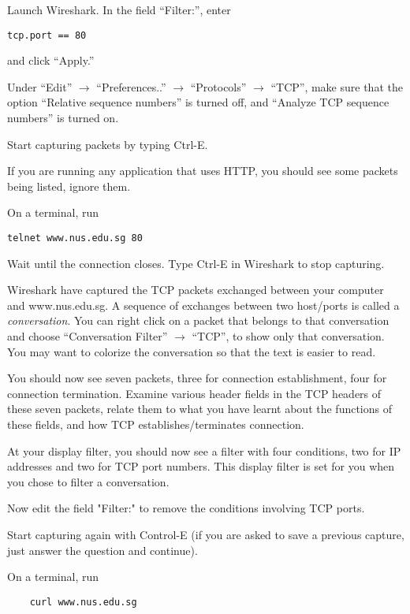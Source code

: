 \documentclass[a4paper,11pt]{exam}
\begin{document}
\begin{questions}

\question Launch Wireshark.  In the field ``Filter:'', enter 
\begin{verbatim}
tcp.port == 80
\end{verbatim}
and click ``Apply.''

Under ``Edit'' $\rightarrow$ ``Preferences..'' $\rightarrow$ ``Protocols'' $\rightarrow$ ``TCP'', make sure that the option ``Relative sequence numbers'' is turned off, and ``Analyze TCP sequence numbers'' is turned on.  

Start capturing packets by typing Ctrl-E.

If you are running any application that uses HTTP, you should see some packets being listed, ignore them.

\question 
On a terminal, run 

\begin{verbatim}
telnet www.nus.edu.sg 80
\end{verbatim}

Wait until the connection closes.  Type Ctrl-E in Wireshark to stop capturing.

Wireshark have captured the TCP packets exchanged between your computer and www.nus.edu.sg.  A sequence of exchanges between two host/ports is called a \textit{conversation}.  You can right click on a packet that belongs to that conversation and choose ``Conversation Filter'' $\rightarrow$  ``TCP'', to show only that conversation.  You may want to colorize the conversation so that the text is easier to read. 

You should now see seven packets, three for connection establishment, four for connection termination.  Examine various header fields in the TCP headers of these seven packets, relate them to what you have learnt about the functions of these fields, and how TCP establishes/terminates connection.

\question 

At your display filter, you should now see a filter with four conditions, two for IP addresses and two for TCP port numbers.  This display filter is set for you when you chose to filter a conversation.

Now edit the field "Filter:" to remove the conditions involving TCP ports.

Start capturing again with Control-E (if you are asked to save a previous capture, just answer the question and continue).

On a terminal, run
\begin{verbatim}
	curl www.nus.edu.sg
\end{verbatim}


\end{questions}
\end{document}
